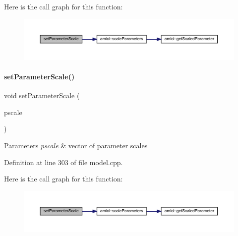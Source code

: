 Here is the call graph for this function\+:
\nopagebreak
\begin{figure}[H]
\begin{center}
\leavevmode
\includegraphics[width=350pt]{classamici_1_1_model_a7e25febbfd9db80f64a4f73a2718bda7_cgraph}
\end{center}
\end{figure}
\mbox{\label{classamici_1_1_model_a64aee7434ee9f99f004d8dc8eb776bc6}} 
\paragraph{\texorpdfstring{set\+Parameter\+Scale()}{setParameterScale()}\hspace{0.1cm}{\footnotesize\ttfamily [2/2]}}
{\footnotesize\ttfamily void set\+Parameter\+Scale (\begin{DoxyParamCaption}\item[{const std\+::vector$<$ \mbox{\hyperlink{namespaceamici_a42f062082226e9284c201d9eab71a3a0}{Parameter\+Scaling}} $>$ \&}]{pscale }\end{DoxyParamCaption})}


\begin{DoxyParams}{Parameters}
{\em pscale} & vector of parameter scales \\
\hline
\end{DoxyParams}


Definition at line 303 of file model.\+cpp.

Here is the call graph for this function\+:
\nopagebreak
\begin{figure}[H]
\begin{center}
\leavevmode
\includegraphics[width=350pt]{classamici_1_1_model_a64aee7434ee9f99f004d8dc8eb776bc6_cgraph}
\end{center}
\end{figure}
\mbox{\label{classamici_1_1_model_a1bb7ee08df1e2e42da7dceb2100b6131}} 
